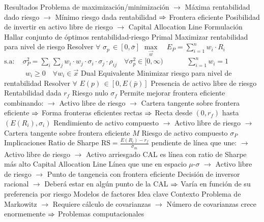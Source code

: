 \documentclass{nuevotema}
\begin{document}
\begin{esquemal}
				\4 Resultados
				\4[] Problema de maximización/minimización
				\4[] $\to$ Máxima rentabilidad dado riesgo
				\4[] $\to$ Mínimo riesgo dada rentabilidad
				\4[] $\Rightarrow$ Frontera eficiente
				\4[] Posibilidad de invertir en activo libre de riesgo
				\4[] $\to$ Capital Allocation Line
			\3 Formulación
				\4 Hallar conjunto de óptimos rentabilidad-riesgo
				\4 Primal
				\4[] Maximizar rentabilidad para nivel de riesgo
				\4[] Resolver $\forall$ $\sigma_p \, \in \left[0, \bar{\sigma} \right]$
				\4[] $\underset{\vec{w}}{\max} \quad E_P = \sum_{i=1}^n w_i \cdot R_i$
				\4[] $\text{s.a}: \quad \sigma_P^2 = \sum_i \sum_j w_i \cdot w_j \cdot \sigma_i \cdot \sigma_j \cdot \rho_{ij} \quad \forall \sigma_p^2 \in [0,\infty)$
				\4[] $\quad \quad \quad \sum_{i=1}^n w_i = 1$
				\4[] $\quad \quad \quad w_i \geq 0 \quad \forall w_i \in \vec{x}$
				\4 Dual
				\4[] Equivalente
				\4[] Minimizar riesgo para nivel de rentabilidad
				\4[] Resolver $\forall$ $E(p) \, \in \left[0, E(\bar{p}) \right]$
				\4 Presencia de activo libre de riesgo
				\4[] Rentabilidad dada $r_f$
				\4[] Riesgo nulo $\sigma_f$
				\4[] Permite mejorar frontera eficiente combinando:
				\4[] $\to$ Activo libre de riesgo
				\4[] $\to$ Cartera tangente sobre frontera eficiente
				\4[] $\Rightarrow$ Forma fronteras eficientes rectas
				\4[] $\Rightarrow$ Recta desde $(0,r_f)$ hasta $(E(R_i), \sigma_i)$
				\4[] Rendimiento de activo compuesto
				\4[] $\to$ Activo libre de riesgo
				\4[] $\to$ Cartera tangente sobre frontera eficiente $M$
				\4[] 
				\4[] Riesgo de activo compuesto $\sigma_P$
				\4[] 
			\3 Implicaciones
				\4 Ratio de Sharpe
				\4[] $\text{RS} = \frac{E(R_i) - r_f}{\sigma_m}$
				\4[] pendiente de línea que une:
				\4[] $\to$ Activo libre de riesgo
				\4[] $\to$ Activo arriesgado
				\4[] CAL es línea con ratio de Sharpe más alto
				\4 Capital Allocation Line
				\4[] Línea que une en espacio $\mu$-$\sigma$
				\4[] $\to$ Activo libre de riesgo
				\4[] $\to$ Punto de tangencia con frontera eficiente
				\4[] Decisión de inversor racional
				\4[] $\to$ Deberá estar en algún punto de la CAL
				\4[] $\Rightarrow$ Varía en función de su preferencia por riesgo
				\4[] 
		\2 Modelos de factores
			\3 Idea clave
				\4 Contexto
				\4[] Problema de Markowitz
				\4[] $\to$ Requiere cálculo de covarianzas
				\4[] $\to$ Número de covarianzas crece enormemente
				\4[] $\Rightarrow$ Problemas computacionales

\end{esquemal}
\end{document}
